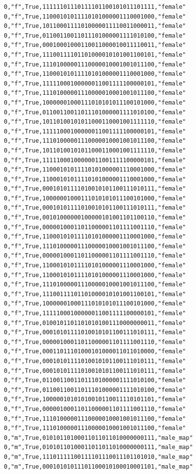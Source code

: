 \documentclass[authoryearcitations]{UoYCSproject}
\begin{document}
\begin{framed}
\begin{verbatim}
0,"f",True,11111101110111101100101011101111,"female"
0,"f",True,11000101011110101000001110001000,"female"
0,"f",True,10110001111010000011110011000011,"female"
0,"f",True,01100110011011101000001111010100,"female"
0,"f",True,00010001000110011000010011110011,"female"
0,"f",True,11100111101101000010101001100101,"female"
0,"f",True,11101000001110000010001001011100,"female"
0,"f",True,11000101011110101000001110001000,"female"
0,"f",True,11111000100000011001111100000101,"female"
0,"f",True,11101000001110000010001001011100,"female"
0,"f",True,10000001000111010101011100101000,"female"
0,"f",True,01100110011011101000001111010100,"female"
0,"f",True,10110100101011000110001001111110,"female"
0,"f",True,11111000100000011001111100000101,"female"
0,"f",True,11101000001110000010001001011100,"female"
0,"f",True,10110100101011000110001001111110,"female"
0,"f",True,11111000100000011001111100000101,"female"
0,"f",True,11000101011110101000001110001000,"female"
0,"f",True,11000101011110101000001110001000,"female"
0,"f",True,00010101111010010101100111010111,"female"
0,"f",True,10000001000111010101011100101000,"female"
0,"f",True,00010101111010010101100111010111,"female"
0,"f",True,00101000000100000101001101100110,"female"
0,"f",True,00000100011011000001101111001110,"female"
0,"f",True,11000101011110101000001110001000,"female"
0,"f",True,11101000001110000010001001011100,"female"
0,"f",True,00000100011011000001101111001110,"female"
0,"f",True,11000101011110101000001110001000,"female"
0,"f",True,11000101011110101000001110001000,"female"
0,"f",True,11101000001110000010001001011100,"female"
0,"f",True,11100111101101000010101001100101,"female"
0,"f",True,10000001000111010101011100101000,"female"
0,"f",True,11111000100000011001111100000101,"female"
0,"f",True,01001011011010101001110000000011,"female"
0,"f",True,00010101111010010101100111010111,"female"
0,"f",True,00000100011011000001101111001110,"female"
0,"f",True,00011011101000101000011011010000,"female"
0,"f",True,00010101111010010101100111010111,"female"
0,"f",True,00010101111010010101100111010111,"female"
0,"f",True,01100110011011101000001111010100,"female"
0,"f",True,01100110011011101000001111010100,"female"
0,"f",True,10000010101010010110011110101101,"female"
0,"f",True,00000100011011000001101111001110,"female"
0,"f",True,11101000001110000010001001011100,"female"
0,"f",True,11101000001110000010001001011100,"female"
0,"m",True,01010110100011011011010000000111,"male_map"
0,"m",True,01010110100011011011010000000111,"male_map"
0,"m",True,11101111100111101110011101101010,"male_map"
0,"m",True,00010101011101100010100010001101,"male_map"

\end{verbatim}
\end{framed}
\end{document}
